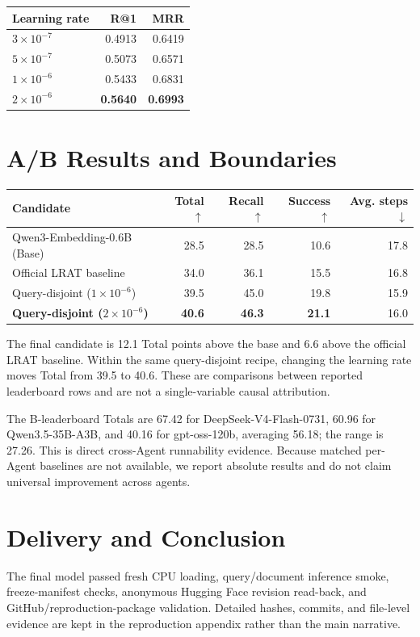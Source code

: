 \documentclass[10pt,a4paper]{article}
\begin{document}
\begin{center}
\small
\begin{tabular}{lrr}
\toprule
Learning rate & R@1 & MRR \\
\midrule
$3\times10^{-7}$ & 0.4913 & 0.6419 \\
$5\times10^{-7}$ & 0.5073 & 0.6571 \\
$1\times10^{-6}$ & 0.5433 & 0.6831 \\
\textbf{$2\times10^{-6}$} & \textbf{0.5640} & \textbf{0.6993} \\
\bottomrule
\end{tabular}
\end{center}

\section{A/B Results and Boundaries}
\begin{center}
\small
\begin{tabular}{lrrrr}
\toprule
Candidate & Total $\uparrow$ & Recall $\uparrow$ & Success $\uparrow$ & Avg. steps $\downarrow$ \\
\midrule
Qwen3-Embedding-0.6B (Base) & 28.5 & 28.5 & 10.6 & 17.8 \\
Official LRAT baseline & 34.0 & 36.1 & 15.5 & 16.8 \\
Query-disjoint ($1\times10^{-6}$) & 39.5 & 45.0 & 19.8 & 15.9 \\
\textbf{Query-disjoint ($2\times10^{-6}$)} & \textbf{40.6} & \textbf{46.3} & \textbf{21.1} & 16.0 \\
\bottomrule
\end{tabular}
\end{center}

The final candidate is 12.1 Total points above the base and 6.6 above the official LRAT baseline. Within the same query-disjoint recipe, changing the learning rate moves Total from 39.5 to 40.6. These are comparisons between reported leaderboard rows and are not a single-variable causal attribution.

The B-leaderboard Totals are 67.42 for DeepSeek-V4-Flash-0731, 60.96 for Qwen3.5-35B-A3B, and 40.16 for gpt-oss-120b, averaging 56.18; the range is 27.26. This is direct cross-Agent runnability evidence. Because matched per-Agent baselines are not available, we report absolute results and do not claim universal improvement across agents.

\section{Delivery and Conclusion}
The final model passed fresh CPU loading, query/document inference smoke, freeze-manifest checks, anonymous Hugging Face revision read-back, and GitHub/reproduction-package validation. Detailed hashes, commits, and file-level evidence are kept in the reproduction appendix rather than the main narrative.
\end{document}
